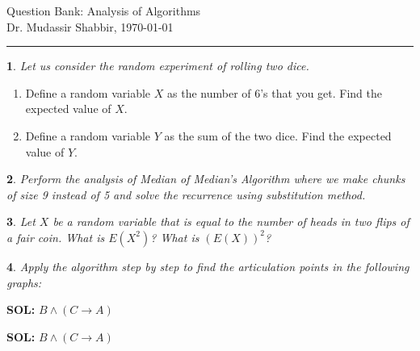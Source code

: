 \documentclass[%
addpoints]{exam}
\theoremstyle{problem}
\newtheorem{p}{}
\begin{document}
 \pagestyle{empty}
 \begin{FlushLeft}
Question Bank: Analysis of Algorithms\\Dr. Mudassir Shabbir,
\today
\end{FlushLeft}

	
\thispagestyle{myheadings}
\rule{500pt}{1.5pt}

\begin{p}
Let us consider the random experiment of rolling two dice.
\hfill \end{p}
\begin{enumerate}
    \item Define a random variable \(X\) as the number of 6's that you get. Find the expected value of \(X\).
    \item Define a random variable \(Y\) as the sum of the two dice. Find the expected value of \(Y\).
\end{enumerate}

\begin{p}
Perform the analysis of Median of Median's Algorithm where we make chunks of size 9 instead of 5 and solve the recurrence using substitution method.
\hfill \end{p}

\begin{p}
Let \( X \) be a random variable that is equal to the number of heads in two flips of a  
fair coin. What is \( E(X^2) \)? What is \( (E(X))^2 \)?
\hfill \end{p}

\begin{p}
Apply the algorithm step by step to find the articulation points in the following graphs:
\end{p}

\begin{center}
\end{center}
\ifanswers
{\bf SOL:}  $B\wedge (C\to A)$
\vfill
\fi

\ifanswers
{\bf SOL:}  $B\wedge (C\to A)$
\vfill
\fi
\begin{center}
\end{center}
\end{document}
